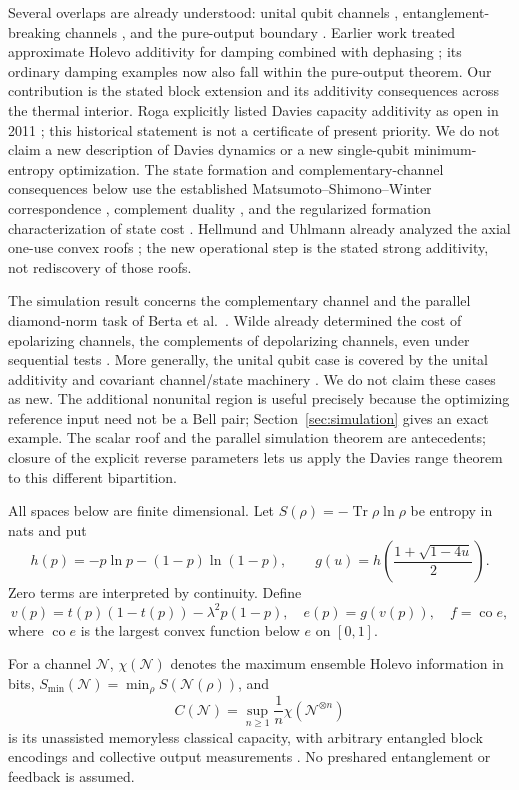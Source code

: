 \documentclass[11pt]{article}
\newcommand{\Tr}{\operatorname{Tr}}
\newcommand{\co}{\operatorname{co}}
\newcommand{\Smin}{S_{\min}}
\begin{document}
Several overlaps are already understood: unital qubit channels \cite{king}, entanglement-breaking channels \cite{shor}, and the pure-output boundary \cite{tang}. Earlier work treated approximate Holevo additivity for damping combined with dephasing \cite{leditzky}; its ordinary damping examples now also fall within the pure-output theorem. Our contribution is the stated block extension and its additivity consequences across the thermal interior. Roga explicitly listed Davies capacity additivity as open in 2011 \cite[Section 6, p.~78]{rogathesis}; this historical statement is not a certificate of present priority. We do not claim a new description of Davies dynamics or a new single-qubit minimum-entropy optimization. The state formation and complementary-channel consequences below use the established Matsumoto--Shimono--Winter correspondence \cite{msw}, complement duality \cite{conjugate}, and the regularized formation characterization of state cost \cite{hht}. Hellmund and Uhlmann already analyzed the axial one-use convex roofs \cite{hu}; the new operational step is the stated strong additivity, not rediscovery of those roofs.


The simulation result concerns the complementary channel and the parallel
diamond-norm task of Berta et al.\ \cite{bcbw}. Wilde already determined the
cost of epolarizing channels, the complements of depolarizing channels, even
under sequential tests \cite[Section IV.D]{wilde}. More generally, the unital
qubit case is covered by the unital additivity and covariant channel/state
machinery \cite{king,msw,wilde}. We do not claim these cases as new. The
additional nonunital region is useful precisely because the optimizing
reference input need not be a Bell pair; Section~\ref{sec:simulation} gives
an exact example. The scalar roof and the parallel simulation theorem are
antecedents; closure of the explicit reverse parameters lets us apply the
Davies range theorem to this different bipartition.

All spaces below are finite dimensional. Let $S(\rho)=-\Tr\rho\ln\rho$ be entropy in nats and put
\[
 h(p)=-p\ln p-(1-p)\ln(1-p),\qquad
 g(u)=h\left(\frac{1+\sqrt{1-4u}}2\right).
\]
Zero terms are interpreted by continuity. Define
\begin{equation}\label{eq:ef}
 v(p)=t(p)(1-t(p))-\lambda^2p(1-p),\quad
 e(p)=g(v(p)),\quad f=\co e,
\end{equation}
where $\co e$ is the largest convex function below $e$ on $[0,1]$.

For a channel $\mathcal N$, $\chi(\mathcal N)$ denotes the maximum ensemble Holevo information in bits, $\Smin(\mathcal N)=\min_\rho S(\mathcal N(\rho))$, and
\[
 C(\mathcal N)=\sup_{n\ge1}\frac1n\chi(\mathcal N^{\otimes n})
\]
is its unassisted memoryless classical capacity, with arbitrary entangled block encodings and collective output measurements \cite{holevo,sw}. No preshared entanglement or feedback is assumed.
\end{document}
